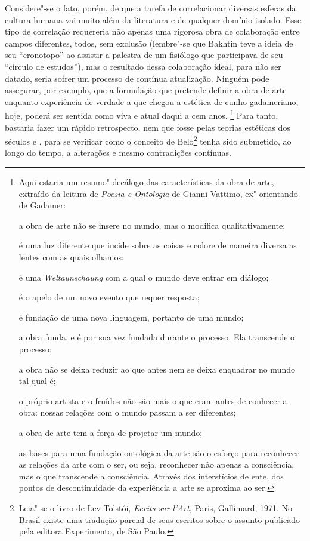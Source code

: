 Considere"-se o fato, porém, de que a tarefa de correlacionar diversas
esferas da cultura humana vai muito além da literatura e de qualquer
domínio isolado. Esse tipo de correlação requereria não apenas uma
rigorosa obra de colaboração entre campos diferentes, todos, sem
exclusão (lembre"-se que Bakhtin teve a ideia de seu ``cronotopo'' ao
assistir a palestra de um fisiólogo que participava de seu ``círculo de
estudos''), mas o resultado dessa colaboração ideal, para não ser
datado, seria sofrer um processo de contínua atualização. Ninguém pode
assegurar, por exemplo, que a formulação que pretende definir a obra de
arte enquanto experiência de verdade a que chegou a estética de cunho
gadameriano, hoje, poderá ser sentida como viva e atual daqui a cem
anos. \footnote{Aqui estaria um resumo"-decálogo das características da
  obra de arte, extraído da leitura de \emph{Poesia e Ontologia} de
  Gianni Vattimo, ex"-orientando de Gadamer:

  a obra de arte não se insere no mundo, mas o modifica
  qualitativamente;

  é uma luz diferente que incide sobre as coisas e colore de maneira
  diversa as lentes com as quais olhamos;

  é uma \emph{Weltaunschaung} com a qual o mundo deve entrar em diálogo;

  é o apelo de um novo evento que requer resposta;

  é fundação de uma nova linguagem, portanto de uma mundo;

  a obra funda, e é por sua vez fundada durante o processo. Ela
  transcende o processo;

  a obra não se deixa reduzir ao que antes nem se deixa enquadrar no
  mundo tal qual é;

  o próprio artista e o fruídos não são mais o que eram antes de
  conhecer a obra: nossas relações com o mundo passam a ser diferentes;

  a obra de arte tem a força de projetar um mundo;

  as bases para uma fundação ontológica da arte são o esforço para
  reconhecer as relações da arte com o ser, ou seja, reconhecer não
  apenas a consciência, mas o que transcende a consciência. Através dos
  interstícios de ente, dos pontos de descontinuidade da experiência a
  arte se aproxima ao ser.} Para tanto, bastaria fazer um rápido
retrospecto, nem que fosse pelas teorias estéticas dos séculos  e ,
para se verificar como o conceito de Belo\footnote{Leia"-se o livro de
  Lev Tolstói, \emph{Ecrits sur l'Art}, Paris, Gallimard, 1971. No
  Brasil existe uma tradução parcial de seus escritos sobre o assunto
  publicado pela editora Experimento, de São Paulo.} tenha sido
submetido, ao longo do tempo, a alterações e mesmo contradições
contínuas.

